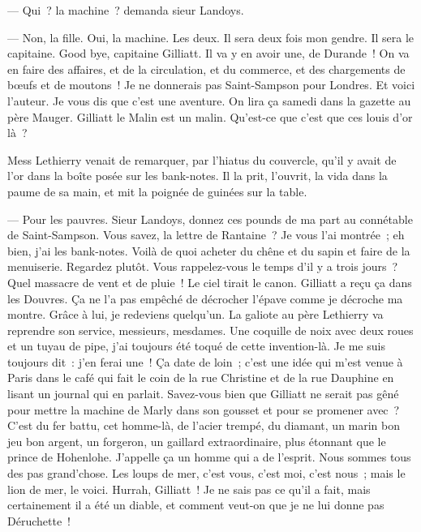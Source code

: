 \documentclass[french,twoside]{book} %
\begin{document}
— Qui ? la machine ? demanda sieur Landoys.\par
— Non, la fille. Oui, la machine. Les deux. Il sera deux fois mon gendre. Il sera le capitaine. Good bye, capitaine Gilliatt. Il va y en avoir une, de Durande ! On va en faire des affaires, et de la circulation, et du commerce, et des chargements de bœufs et de moutons ! Je ne donnerais pas Saint-Sampson pour Londres. Et voici l’auteur. Je vous dis que c’est une aventure. On lira ça samedi dans la gazette au père Mauger. Gilliatt le Malin est un malin. Qu’est-ce que c’est que ces louis d’or là ?\par
Mess Lethierry venait de remarquer, par l’hiatus du couvercle, qu’il y avait de l’or dans la boîte posée sur les bank-notes. Il la prit, l’ouvrit, la vida dans la paume de sa main, et mit la poignée de guinées sur la table.\par
 — Pour les pauvres. Sieur Landoys, donnez ces pounds de ma part au connétable de Saint-Sampson. Vous savez, la lettre de Rantaine ? Je vous l’ai montrée ; eh bien, j’ai les bank-notes. Voilà de quoi acheter du chêne et du sapin et faire de la menuiserie. Regardez plutôt. Vous rappelez-vous le temps d’il y a trois jours ? Quel massacre de vent et de pluie ! Le ciel tirait le canon. Gilliatt a reçu ça dans les Douvres. Ça ne l’a pas empêché de décrocher l’épave comme je décroche ma montre. Grâce à lui, je redeviens quelqu’un. La galiote au père Lethierry va reprendre son service, messieurs, mesdames. Une coquille de noix avec deux roues et un tuyau de pipe, j’ai toujours été toqué de cette invention-là. Je me suis toujours dit : j’en ferai une ! Ça date de loin ; c’est une idée qui m’est venue à Paris dans le café qui fait le coin de la rue Christine et de la rue Dauphine en lisant un journal qui en parlait. Savez-vous bien que Gilliatt ne serait pas gêné pour mettre la machine de Marly dans son gousset et pour se promener avec ? C’est du fer battu, cet homme-là, de l’acier trempé, du diamant, un marin bon jeu bon argent, un forgeron, un gaillard extraordinaire, plus étonnant que le prince de Hohenlohe. J’appelle ça un homme qui a de l’esprit. Nous sommes tous des pas grand’chose. Les loups de mer, c’est vous, c’est moi, c’est nous ; mais le lion de mer, le voici. Hurrah, Gilliatt ! Je ne sais pas ce qu’il a fait, mais certainement il a été un diable, et comment veut-on que je ne lui donne pas Déruchette !\par
\end{document}
